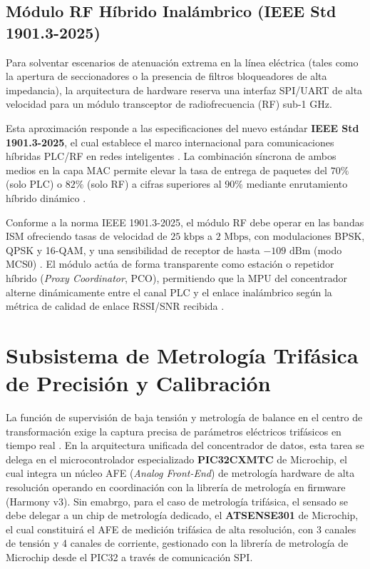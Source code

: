 \subsection{Módulo RF Híbrido Inalámbrico (IEEE Std 1901.3-2025)}
\label{subsec:rf_hibrido}

Para solventar escenarios de atenuación extrema en la línea eléctrica (tales como la apertura de seccionadores o la presencia de filtros bloqueadores de alta impedancia), la arquitectura de hardware reserva una interfaz SPI/UART de alta velocidad para un módulo transceptor de radiofrecuencia (RF) sub-1 GHz.

Esta aproximación responde a las especificaciones del nuevo estándar \textbf{IEEE Std 1901.3-2025}, el cual establece el marco internacional para comunicaciones híbridas PLC/RF en redes inteligentes \cite{11267209}. La combinación síncrona de ambos medios en la capa MAC permite elevar la tasa de entrega de paquetes del $70\%$ (solo PLC) o $82\%$ (solo RF) a cifras superiores al \textbf{$90\%$} mediante enrutamiento híbrido dinámico \cite{7390450}.

Conforme a la norma IEEE 1901.3-2025, el módulo RF debe operar en las bandas ISM ofreciendo tasas de velocidad de $25\text{ kbps}$ a $2\text{ Mbps}$, con modulaciones BPSK, QPSK y 16-QAM, y una sensibilidad de receptor de hasta $-109\text{ dBm}$ (modo MCS0) \cite{11267209}. El módulo actúa de forma transparente como estación o repetidor híbrido (\textit{Proxy Coordinator}, PCO), permitiendo que la MPU del concentrador alterne dinámicamente entre el canal PLC y el enlace inalámbrico según la métrica de calidad de enlace RSSI/SNR recibida \cite{11267209}.

\section{Subsistema de Metrología Trifásica de Precisión y Calibración}
\label{sec:metrologia_trifasica}

La función de supervisión de baja tensión y metrología de balance en el centro de transformación exige la captura precisa de parámetros eléctricos trifásicos en tiempo real \cite{10488780}. En la arquitectura unificada del concentrador de datos, esta tarea se delega en el microcontrolador especializado \textbf{PIC32CXMTC} de Microchip, el cual integra un núcleo AFE (\textit{Analog Front-End}) de metrología hardware de alta resolución operando en coordinación con la librería de metrología en firmware (Harmony v3). Sin emabrgo, para el caso de metrología trifásica, el sensado se debe delegar a un chip de metrología dedicado, el \textbf{ATSENSE301} de Microchip, el cual constituirá el AFE de medición trifásica de alta resolución, con 3 canales de tensión y 4 canales de corriente, gestionado con la librería de metrología de Microchip desde el PIC32 a través de comunicación SPI.


